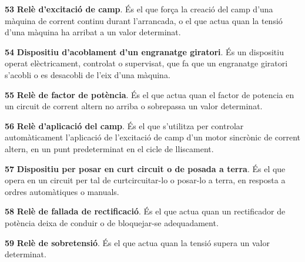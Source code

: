 \begin{multicols}{2}
\begin{list}{}
\item[\textbf{53}]  
\textbf{Rel\`{e} d'excitaci\'{o} de camp}. \'{E}s el
que for\c{c}a la creaci\'{o} del camp d'una m\`{a}quina de corrent continu
durant l'arrancada, o el que actua quan la tensi\'{o} d'una m\`{a}quina ha
arribat a un valor determinat.

\item[\textbf{54}]  
\textbf{Dispositiu d'acoblament d'un engranatge giratori}. \'{E}s un dispositiu operat el\`{e}ctricament, controlat o supervisat, que fa que un engranatge giratori
s'acobli o es desacobli de l'eix d'una m\`{a}quina.

\item[\textbf{55}]   
\textbf{Rel\`{e} de factor de pot\`{e}ncia}.
\'{E}s el que actua quan el factor de potencia en un circuit de corrent altern no arriba o
sobrepassa un valor determinat.

\item[\textbf{56}]   
\textbf{Rel\`{e} d'aplicaci\'{o} del camp}.
\'{E}s el que s'utilitza per controlar autom\`{a}ticament l'aplicaci\'{o} de l'excitaci\'{o} de camp d'un
motor sincr\`{o}nic de corrent altern, en un punt predeterminat en el cicle de lliscament.

\item[\textbf{57}]  
\textbf{Dispositiu per posar en  curt circuit o de posada a terra}. \'{E}s el que
opera en un circuit per tal de curtcircuitar-lo  o
posar-lo a terra, en resposta a ordres autom\`{a}tiques o manuals.

\item[\textbf{58}]   
\textbf{Rel\`{e} de fallada de rectificaci\'{o}}. \'{E}s el que actua quan un rectificador de pot\`{e}ncia deixa de conduir o de bloquejar-se adequadament.

\item[\textbf{59}]   
\textbf{Rel\`{e} de sobretensi\'{o}}. \'{E}s el que
actua quan la tensi\'{o} supera un valor determinat.


\end{list}
\end{multicols}
